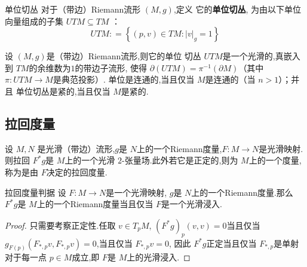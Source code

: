 \documentclass[../../几何与拓扑.tex]{subfiles}
\begin{document}
\begin{definition}{单位切丛}
    对于（带边）Riemann流形 \(  \left( M,g \right)   \),定义 它的\textbf{单位切丛},
    为由以下单位向量组成的子集 \(  UTM\subseteq TM  \) ： \[
    UTM: =  \left\{ \left( p,v \right) \in TM: \left| v \right|_{g}= 1   \right\}
    \]  
\end{definition}

\begin{proposition}
    设 \(  \left( M,g \right)   \)是（带边）Riemann流形,则它的单位 切丛 \(  UTM  \)是一个光滑的,真嵌入到 \(  TM  \)的余维数为\(  1  \)的带边子流形,
    使得 \(  \partial \left( UTM \right)= \pi ^{-1} \left( \partial M \right)    \)（其中 \(  \pi : UTM\to M  \)是典范投影）.
    单位是连通的,当且仅当 \(  M  \)是连通的（当 \(  n>1  \)）；并且 单位切丛是紧的,当且仅当 \(  M  \)是紧的.        
\end{proposition}







\subsection{拉回度量}

\begin{definition}
    设 $ M,N $ 是光滑（带边）流形,$ g $是 $ N $上的一个Riemann度量,$ F:M\to N $是光滑映射.则拉回 $ F^{*}g $是 $ M $上的一个光滑 $ 2 $-张量场.此外若它是正定的,则为 $ M $上的一个度量,称为是由 $ F $决定的拉回度量.       
\end{definition}

\begin{proposition}{拉回度量判据}
    设 $ F:M\to N $是一个光滑映射, $ g $是 $ N $上的一个Riemann度量.那么 $ F^{*}g $是 $ M $上的一个Riemann度量当且仅当 $ F $是一个光滑浸入.      
\end{proposition}
\begin{proof}
    只需要考察正定性.任取 $ v \in T_{p }M $, $ \left( F^{*}g \right)_{p} \left( v,v \right)=0  $当且仅当 $ g_{F\left( p \right) }\left( F_{*,p}v,F_{*,p}v \right)  =0$,当且仅当 $ F_{*,p}v=0 $, 因此 \(  F^{*}g  \)正定当且仅当 \(  F_{*,p}  \)是单射对于每一点 \(  p \in M  \)成立,即 \(  F  \)是 \(  M  \)上的光滑浸入.      
\end{proof}
\end{document}
